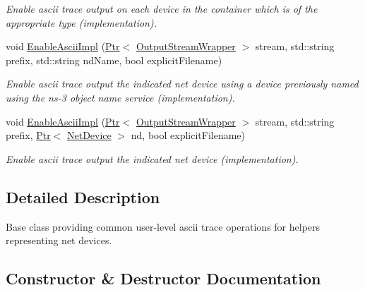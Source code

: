 \begin{DoxyCompactItemize}
\begin{DoxyCompactList}\small\item\em Enable ascii trace output on each device in the container which is of the appropriate type (implementation). \end{DoxyCompactList}\item 
void \hyperlink{classns3_1_1AsciiTraceHelperForDevice_a3e02fc4fee8960bdd5ddcd9f78734001}{Enable\+Ascii\+Impl} (\hyperlink{classns3_1_1Ptr}{Ptr}$<$ \hyperlink{classns3_1_1OutputStreamWrapper}{Output\+Stream\+Wrapper} $>$ stream, std\+::string prefix, std\+::string nd\+Name, bool explicit\+Filename)
\begin{DoxyCompactList}\small\item\em Enable ascii trace output the indicated net device using a device previously named using the ns-\/3 object name service (implementation). \end{DoxyCompactList}\item 
void \hyperlink{classns3_1_1AsciiTraceHelperForDevice_af91b0b1f15eccb33ce7f4c4610b5060d}{Enable\+Ascii\+Impl} (\hyperlink{classns3_1_1Ptr}{Ptr}$<$ \hyperlink{classns3_1_1OutputStreamWrapper}{Output\+Stream\+Wrapper} $>$ stream, std\+::string prefix, \hyperlink{classns3_1_1Ptr}{Ptr}$<$ \hyperlink{classns3_1_1NetDevice}{Net\+Device} $>$ nd, bool explicit\+Filename)
\begin{DoxyCompactList}\small\item\em Enable ascii trace output the indicated net device (implementation). \end{DoxyCompactList}\end{DoxyCompactItemize}


\subsection{Detailed Description}
Base class providing common user-\/level ascii trace operations for helpers representing net devices. 

\subsection{Constructor \& Destructor Documentation}
